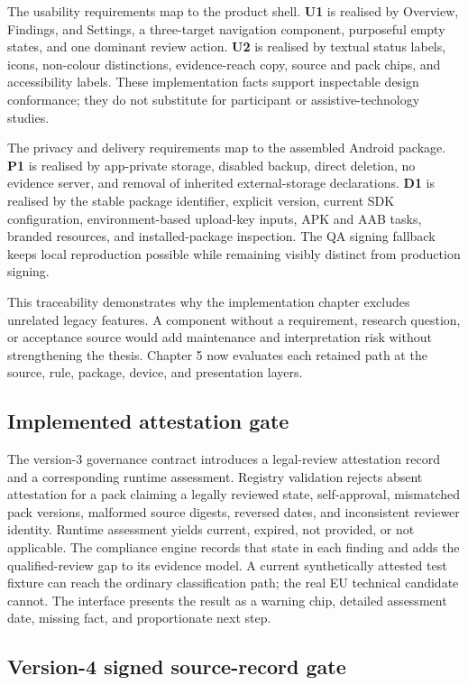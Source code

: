 The usability requirements map to the product shell. \textbf{U1} is realised by Overview, Findings, and Settings, a three-target navigation component, purposeful empty states, and one dominant review action. \textbf{U2} is realised by textual status labels, icons, non-colour distinctions, evidence-reach copy, source and pack chips, and accessibility labels. These implementation facts support inspectable design conformance; they do not substitute for participant or assistive-technology studies.

The privacy and delivery requirements map to the assembled Android package. \textbf{P1} is realised by app-private storage, disabled backup, direct deletion, no evidence server, and removal of inherited external-storage declarations. \textbf{D1} is realised by the stable package identifier, explicit version, current SDK configuration, environment-based upload-key inputs, APK and AAB tasks, branded resources, and installed-package inspection. The QA signing fallback keeps local reproduction possible while remaining visibly distinct from production signing.

This traceability demonstrates why the implementation chapter excludes unrelated legacy features. A component without a requirement, research question, or acceptance source would add maintenance and interpretation risk without strengthening the thesis. Chapter 5 now evaluates each retained path at the source, rule, package, device, and presentation layers.
\subsection{Implemented attestation gate}

The version-3 governance contract introduces a legal-review attestation record and a corresponding runtime assessment. Registry validation rejects absent attestation for a pack claiming a legally reviewed state, self-approval, mismatched pack versions, malformed source digests, reversed dates, and inconsistent reviewer identity. Runtime assessment yields current, expired, not provided, or not applicable. The compliance engine records that state in each finding and adds the qualified-review gap to its evidence model. A current synthetically attested test fixture can reach the ordinary classification path; the real EU technical candidate cannot. The interface presents the result as a warning chip, detailed assessment date, missing fact, and proportionate next step.

\subsection{Version-4 signed source-record gate}

